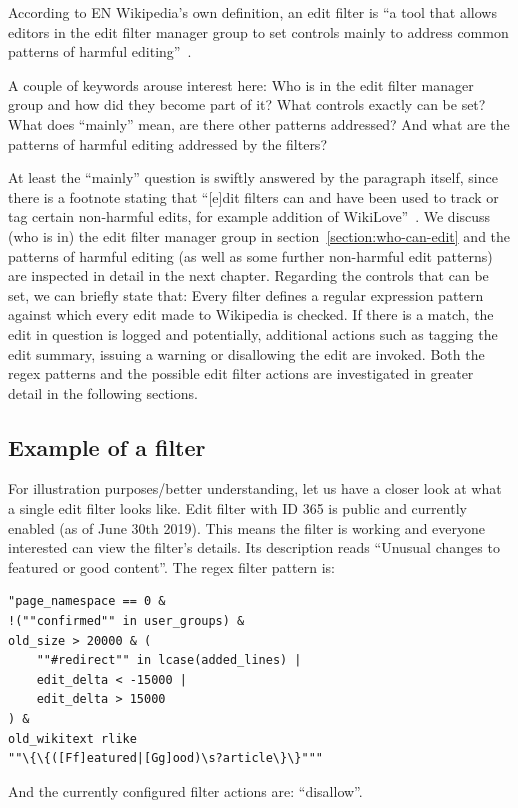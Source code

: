 According to EN Wikipedia's own definition, an edit filter is ``a tool that allows editors in the edit filter manager group to set controls mainly to address common patterns of harmful editing''~\cite{Wikipedia:EditFilter}.

A couple of keywords arouse interest here: %
Who is in the edit filter manager group and how did they become part of it?
What controls exactly can be set?
What does ``mainly'' mean, are there other patterns addressed?
And what are the patterns of harmful editing addressed by the filters?

At least the ``mainly'' question is swiftly answered by the paragraph itself, since there is a footnote stating that ``[e]dit filters can and have been used to track or tag certain non-harmful edits, for example addition of WikiLove''~\cite{Wikipedia:EditFilter}.
We discuss (who is in) the edit filter manager group in section~\ref{section:who-can-edit} and the patterns of harmful editing (as well as some further non-harmful edit patterns) are inspected in detail in the next chapter.
Regarding the controls that can be set, we can briefly state that:
Every filter defines a regular expression pattern against which every edit made to Wikipedia is checked.
If there is a match, the edit in question is logged and potentially, additional actions such as tagging the edit summary, issuing a warning or disallowing the edit are invoked.
Both the regex patterns and the possible edit filter actions are investigated in greater detail in the following sections.

\subsection{Example of a filter}

For illustration purposes/better understanding, let us have a closer look at what a single edit filter looks like.
Edit filter with ID 365 is public and currently enabled (as of June 30th 2019).
This means the filter is working and everyone interested can view the filter's details.
Its description reads ``Unusual changes to featured or good content''.
The regex filter pattern is:
\begin{verbatim}
"page_namespace == 0 &
!(""confirmed"" in user_groups) &
old_size > 20000 & (
    ""#redirect"" in lcase(added_lines) |
    edit_delta < -15000 |
    edit_delta > 15000
) &
old_wikitext rlike
""\{\{([Ff]eatured|[Gg]ood)\s?article\}\}"""
\end{verbatim}
And the currently configured filter actions are: ``disallow''.

